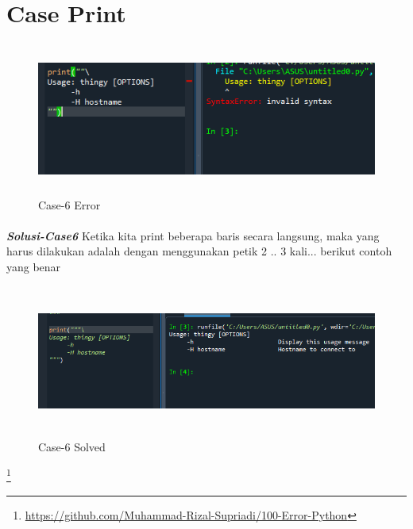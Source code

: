 \documentclass[12pt,a4paper]{article}
\begin{document}
\newpage
\section{Case Print}
\begin{figure}[ht]
    \centerline{\includegraphics[width=15cm,height=5cm]{image/case6.png}}
    \renewcommand{\figurename}{Gambar}
    \caption{Case-6 Error}
\end{figure}
\paragraph{}\textbf{\textit{Solusi-Case6}} {Ketika kita print beberapa baris secara langsung, maka yang harus dilakukan adalah dengan menggunakan petik 2 .. 3 kali... berikut contoh yang benar}
\begin{figure}[ht]
    \centerline{\includegraphics[width=15cm,height=5cm]{image/case6-solved.png}}
    \renewcommand{\figurename}{Gambar}
    \caption{Case-6 Solved}
\end{figure}

\footnote{\url{https://github.com/Muhammad-Rizal-Supriadi/100-Error-Python}}
\newpage
\end{document}
